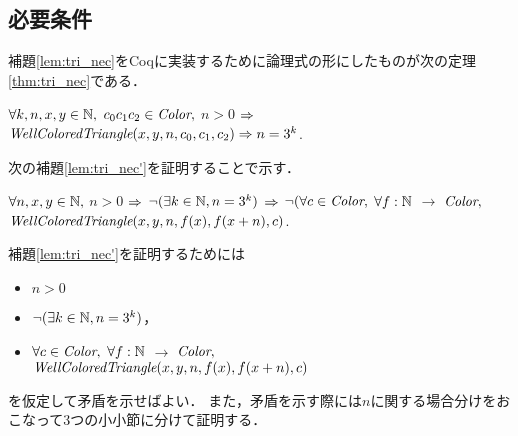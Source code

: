 \subsection{必要条件} \label{sec:suf}
補題\ref{lem:tri_nec}をCoqに実装するために論理式の形にしたものが次の定理\ref{thm:tri_nec}である．
\begin{thm}[必要条件] \label{thm:tri_nec}
  $\forall k, n, x, y \in \mathbb{N},$ $c_0 c_1 c_2 \in \textit{Color},$
  $n > 0$ $\Rightarrow$ 
  $\textit{WellColoredTriangle}(x,y,n,c_0,c_1,c_2) \Rightarrow n = 3 ^ k$.
\end{thm}
次の補題\ref{lem:tri_nec'}を証明することで示す．
\begin{lem}[必要条件の対偶] \label{lem:tri_nec'}
  $\forall n, x, y \in \mathbb{N},$ $n > 0$ $\Rightarrow$ 
  $\lnot(\exists k \in \mathbb{N}, n = 3 ^ k)$ $\Rightarrow$
  $\lnot( \forall c \in \textit{Color},$
  $\forall f:\mathbb{N}$ $\to$ $\textit{Color},$
  $\textit{WellColoredTriangle}(x,y,n,f(x),f(x+n),c)$.
\end{lem}
補題\ref{lem:tri_nec'}を証明するためには
\begin{itemize}
\item
  $n > 0$
\item
  $\lnot(\exists k \in \mathbb{N}, n = 3 ^ k)$，
\item
  $\forall c \in \textit{Color},$ $\forall f:\mathbb{N}$ $\to$ $\textit{Color},$ \\
  $\textit{WellColoredTriangle}(x,y,n,f(x),f(x+n),c)$
\end{itemize}
を仮定して矛盾を示せばよい．
また，矛盾を示す際には$n$に関する場合分けをおこなって$3$つの小小節に分けて証明する．
